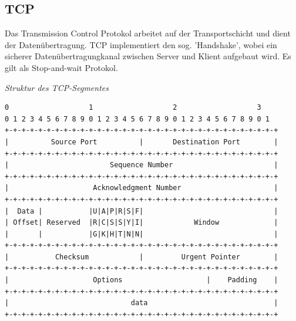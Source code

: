 \documentclass{scrartcl}
\begin{document}
    \subsection{TCP}
    Das Transmission Control Protokol arbeitet auf der Transportschicht und dient der Datenübertragung. TCP implementiert den sog. 'Handshake', wobei ein sicherer Datenübertragungkanal zwischen Server und Klient aufgebaut wird. Es gilt als Stop-and-wait Protokol.
    
    \textit{Struktur des TCP-Segmentes}
    \begin{verbatim}
0                   1                   2                   3
0 1 2 3 4 5 6 7 8 9 0 1 2 3 4 5 6 7 8 9 0 1 2 3 4 5 6 7 8 9 0 1
+-+-+-+-+-+-+-+-+-+-+-+-+-+-+-+-+-+-+-+-+-+-+-+-+-+-+-+-+-+-+-+-+
|          Source Port          |       Destination Port        |
+-+-+-+-+-+-+-+-+-+-+-+-+-+-+-+-+-+-+-+-+-+-+-+-+-+-+-+-+-+-+-+-+
|                        Sequence Number                        |
+-+-+-+-+-+-+-+-+-+-+-+-+-+-+-+-+-+-+-+-+-+-+-+-+-+-+-+-+-+-+-+-+
|                    Acknowledgment Number                      |
+-+-+-+-+-+-+-+-+-+-+-+-+-+-+-+-+-+-+-+-+-+-+-+-+-+-+-+-+-+-+-+-+
|  Data |           |U|A|P|R|S|F|                               |
| Offset| Reserved  |R|C|S|S|Y|I|            Window             |
|       |           |G|K|H|T|N|N|                               |
+-+-+-+-+-+-+-+-+-+-+-+-+-+-+-+-+-+-+-+-+-+-+-+-+-+-+-+-+-+-+-+-+
|           Checksum            |         Urgent Pointer        |
+-+-+-+-+-+-+-+-+-+-+-+-+-+-+-+-+-+-+-+-+-+-+-+-+-+-+-+-+-+-+-+-+
|                    Options                    |    Padding    |
+-+-+-+-+-+-+-+-+-+-+-+-+-+-+-+-+-+-+-+-+-+-+-+-+-+-+-+-+-+-+-+-+
|                             data                              |
+-+-+-+-+-+-+-+-+-+-+-+-+-+-+-+-+-+-+-+-+-+-+-+-+-+-+-+-+-+-+-+-+        
    \end{verbatim}
    
\end{document}
